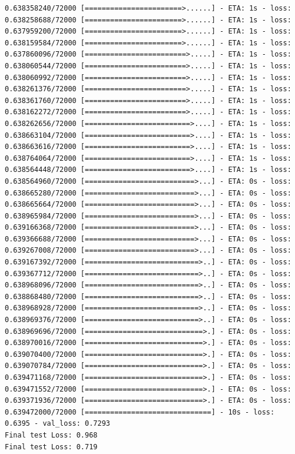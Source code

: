 \documentclass[12pt,fleqn]{article}\usepackage{../../common}
\begin{document}
\begin{verbatim}
0.638358240/72000 [=======================>......] - ETA: 1s - loss: 0.638258688/72000 [=======================>......] - ETA: 1s - loss: 0.637959200/72000 [=======================>......] - ETA: 1s - loss: 0.638159584/72000 [=======================>......] - ETA: 1s - loss: 0.637860096/72000 [========================>.....] - ETA: 1s - loss: 0.638060544/72000 [========================>.....] - ETA: 1s - loss: 0.638060992/72000 [========================>.....] - ETA: 1s - loss: 0.638261376/72000 [========================>.....] - ETA: 1s - loss: 0.638361760/72000 [========================>.....] - ETA: 1s - loss: 0.638162272/72000 [========================>.....] - ETA: 1s - loss: 0.638262656/72000 [=========================>....] - ETA: 1s - loss: 0.638663104/72000 [=========================>....] - ETA: 1s - loss: 0.638663616/72000 [=========================>....] - ETA: 1s - loss: 0.638764064/72000 [=========================>....] - ETA: 1s - loss: 0.638564448/72000 [=========================>....] - ETA: 1s - loss: 0.638564960/72000 [==========================>...] - ETA: 0s - loss: 0.638665280/72000 [==========================>...] - ETA: 0s - loss: 0.638665664/72000 [==========================>...] - ETA: 0s - loss: 0.638965984/72000 [==========================>...] - ETA: 0s - loss: 0.639166368/72000 [==========================>...] - ETA: 0s - loss: 0.639366688/72000 [==========================>...] - ETA: 0s - loss: 0.639267008/72000 [==========================>...] - ETA: 0s - loss: 0.639167392/72000 [===========================>..] - ETA: 0s - loss: 0.639367712/72000 [===========================>..] - ETA: 0s - loss: 0.638968096/72000 [===========================>..] - ETA: 0s - loss: 0.638868480/72000 [===========================>..] - ETA: 0s - loss: 0.638968928/72000 [===========================>..] - ETA: 0s - loss: 0.638969376/72000 [===========================>..] - ETA: 0s - loss: 0.638969696/72000 [============================>.] - ETA: 0s - loss: 0.638970016/72000 [============================>.] - ETA: 0s - loss: 0.639070400/72000 [============================>.] - ETA: 0s - loss: 0.639070784/72000 [============================>.] - ETA: 0s - loss: 0.639471168/72000 [============================>.] - ETA: 0s - loss: 0.639471552/72000 [============================>.] - ETA: 0s - loss: 0.639371936/72000 [============================>.] - ETA: 0s - loss: 0.639472000/72000 [==============================] - 10s - loss: 0.6395 - val_loss: 0.7293
Final test Loss: 0.968
Final test Loss: 0.719
\end{verbatim}
\end{document}
